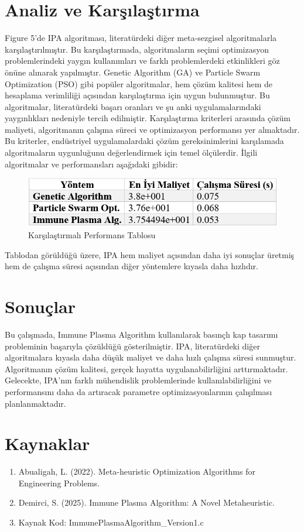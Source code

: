 \documentclass[12pt,a4paper]{article}
\begin{document}
\section{Analiz ve Karşılaştırma}
Figure 5'de IPA algoritması, literatürdeki diğer meta-sezgisel algoritmalarla karşılaştırılmıştır. Bu karşılaştırmada, algoritmaların seçimi optimizasyon problemlerindeki yaygın kullanımları ve farklı problemlerdeki etkinlikleri göz önüne alınarak yapılmıştır. Genetic Algorithm (GA) ve Particle Swarm Optimization (PSO) gibi popüler algoritmalar, hem çözüm kalitesi hem de hesaplama verimliliği açısından karşılaştırma için uygun bulunmuştur. Bu algoritmalar, literatürdeki başarı oranları ve şu anki uygulamalarındaki yaygınlıkları nedeniyle tercih edilmiştir. Karşılaştırma kriterleri arasında çözüm maliyeti, algoritmanın çalışma süreci ve optimizasyon performansı yer almaktadır. Bu kriterler, endüstriyel uygulamalardaki çözüm gereksinimlerini karşılamada algoritmaların uygunluğunu değerlendirmek için temel ölçülerdir. İlgili algoritmalar ve performansları aşağıdaki gibidir:
\begin{figure}[h!]
    \centering
    \includegraphics[width=0.5\linewidth]{5.png}
    \caption{Karşılaştırmalı Performans Tablosu}
    \label{fig:comparison}
\end{figure}


Tablodan görüldüğü üzere, IPA hem maliyet açısından daha iyi sonuçlar üretmiş hem de çalışma süresi açısından diğer yöntemlere kıyasla daha hızlıdır.

\section{Sonuçlar}
Bu çalışmada, Immune Plasma Algorithm kullanılarak basınçlı kap tasarımı probleminin başarıyla çözüldüğü gösterilmiştir. IPA, literatürdeki diğer algoritmalara kıyasla daha düşük maliyet ve daha hızlı çalışma süresi sunmuştur. Algoritmanın çözüm kalitesi, gerçek hayatta uygulanabilirliğini arttırmaktadır.
Gelecekte, IPA'nın farklı mühendislik problemlerinde kullanılabilirliğini ve performansını daha da artıracak parametre optimizasyonlarının çalışılması planlanmaktadır.

\section{Kaynaklar}
\begin{enumerate}
    \item Abualigah, L. (2022). Meta-heuristic Optimization Algorithms for Engineering Problems.
    \item Demirci, S. (2025). Immune Plasma Algorithm: A Novel Metaheuristic.
    \item Kaynak Kod: ImmunePlasmaAlgorithm\_Version1.c
\end{enumerate}
\end{document}
